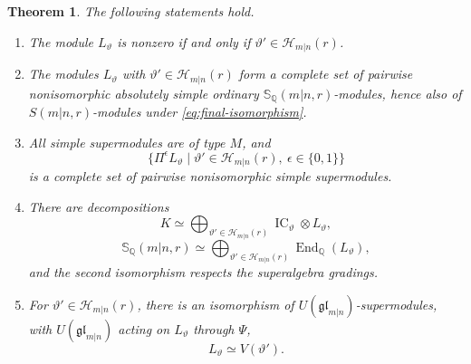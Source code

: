 \documentclass[11pt,a4paper]{amsart}
\newtheorem{theorem}{Theorem}[section]
\theoremstyle{definition}
\theoremstyle{remark}
\newcommand{\Q}{\mathbb Q}
\newcommand{\bS}{\mathbb S}
\newcommand{\IC}{\operatorname{IC}}
\newcommand{\End}{\operatorname{End}}
\numberwithin{equation}{section}
\begin{document}
\begin{theorem}\label{prop:simple}
The following statements hold.
\begin{enumerate}
\item The module $L_\vartheta$ is nonzero if and only if
$\vartheta'\in\mathcal H_{m|n}(r)$.
\item The modules $L_\vartheta$ with
$\vartheta'\in\mathcal H_{m|n}(r)$ form a complete set of pairwise
nonisomorphic absolutely simple ordinary $\bS_\Q(m|n,r)$-modules, hence also of
$S(m|n,r)$-modules under \eqref{eq:final-isomorphism}.
\item All simple supermodules are of type $M$, and
$$
\{\Pi^\epsilon L_\vartheta
  \mid\vartheta'\in\mathcal H_{m|n}(r),\ \epsilon\in\{0,1\}\}
$$
is a complete set of pairwise nonisomorphic simple supermodules.
\item There are decompositions
\begin{equation}\label{eq:relevant-IC-decomposition}
K\simeq\bigoplus_{\vartheta'\in\mathcal H_{m|n}(r)}
\IC_\vartheta\otimes L_\vartheta,
\end{equation}
\begin{equation}\label{eq:relevant-Wedderburn}
\bS_\Q(m|n,r)\simeq\bigoplus_{\vartheta'\in\mathcal H_{m|n}(r)}
\End_\Q(L_\vartheta),
\end{equation}
and the second isomorphism respects the superalgebra gradings.
\item For $\vartheta'\in\mathcal H_{m|n}(r)$, there is an isomorphism of
$U(\mathfrak{gl}_{m|n})$-supermodules, with $U(\mathfrak{gl}_{m|n})$ acting
on $L_\vartheta$ through $\Psi$,
\begin{equation}\label{eq:geometric-covariant}
L_\vartheta\simeq V(\vartheta').
\end{equation}
\end{enumerate}
\end{theorem}
\end{document}
